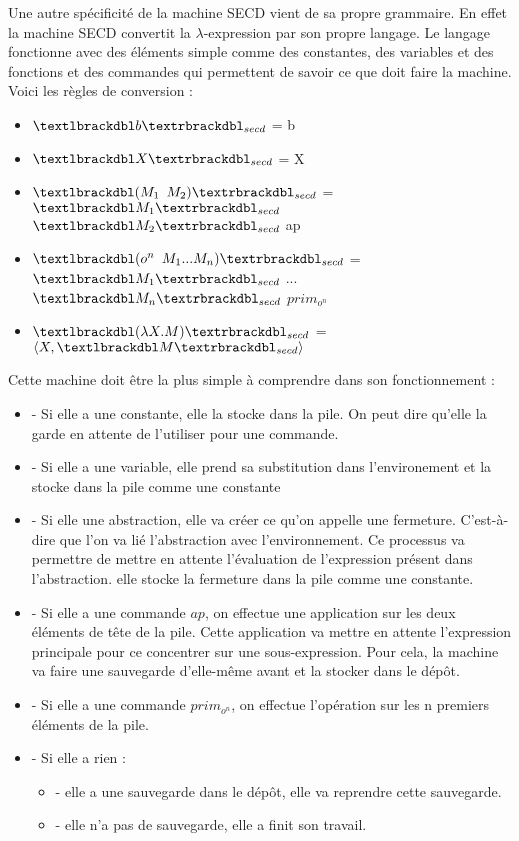\documentclass[10pt,a4paper]{report}
\begin{document}
Une autre spécificité de la machine SECD vient de sa propre grammaire. En effet la machine SECD convertit la $\lambda$-expression par son propre langage. Le langage fonctionne avec des éléments simple comme des constantes, des variables et des fonctions et des commandes qui permettent de savoir ce que doit faire la machine. Voici les règles de conversion :
\smallbreak

\begin{itemize}
\item[] $\textlbrackdbl b\textrbrackdbl _{secd}$ = b
\item[] $\textlbrackdbl X\textrbrackdbl _{secd}$ = X
\item[] $\textlbrackdbl (M_{1}$ $M_{2})\textrbrackdbl _{secd}$ = $\textlbrackdbl M_{1}\textrbrackdbl _{secd}$ $\textlbrackdbl M_{2}\textrbrackdbl _{secd}$ ap
\item[] $\textlbrackdbl (o^{n}$ $M_{1}...M_{n})\textrbrackdbl _{secd}$ = $\textlbrackdbl M_{1}\textrbrackdbl _{secd}$ $...$ $\textlbrackdbl M_{n}\textrbrackdbl _{secd}$ $prim_{o^{n}}$
\item[]  $\textlbrackdbl(\lambda X.M)\textrbrackdbl _{secd}$ =  $\langle X,\textlbrackdbl M\textrbrackdbl _{secd}\rangle$
\end{itemize}
\bigbreak


Cette machine doit être la plus simple à comprendre dans son fonctionnement :
\begin{itemize}
\item[] - Si elle a une constante, elle la stocke dans la pile. On peut dire qu'elle la garde en attente de l'utiliser pour une commande. 
\item[] - Si elle a une variable, elle prend sa substitution dans l'environement et la stocke dans la pile comme une constante
\item[] - Si elle une abstraction, elle va créer ce qu'on appelle une fermeture. C'est-à-dire que l'on va lié l'abstraction avec l'environnement. Ce processus va permettre de mettre en attente l'évaluation de l'expression présent dans l'abstraction. elle stocke la fermeture dans la pile comme une constante.
\item[] - Si elle a une commande $ap$, on effectue une application sur les deux éléments de tête de la pile. Cette application va mettre en attente l'expression principale pour ce concentrer sur une sous-expression. Pour cela, la machine va faire une sauvegarde d'elle-même avant et la stocker dans le dépôt.
\item[] - Si elle a une commande $prim_{o^{n}}$, on effectue l'opération sur les n premiers éléments de la pile.
\item[] - Si elle a rien :
  \begin{itemize}
  \item[] - elle a une sauvegarde dans le dépôt, elle va reprendre cette sauvegarde.
  \item[] - elle n'a pas de sauvegarde, elle a finit son travail.
  \end{itemize}
\end{itemize}
\bigbreak
\end{document}
